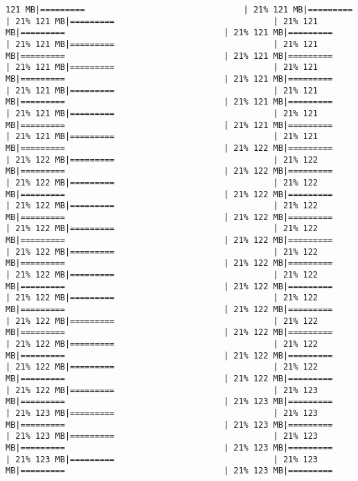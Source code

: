 \documentclass[
]{article}
\begin{document}
\begin{verbatim}
121 MB|=========                                | 21% 121 MB|=========                                | 21% 121 MB|=========                                | 21% 121 MB|=========                                | 21% 121 MB|=========                                | 21% 121 MB|=========                                | 21% 121 MB|=========                                | 21% 121 MB|=========                                | 21% 121 MB|=========                                | 21% 121 MB|=========                                | 21% 121 MB|=========                                | 21% 121 MB|=========                                | 21% 121 MB|=========                                | 21% 121 MB|=========                                | 21% 121 MB|=========                                | 21% 121 MB|=========                                | 21% 121 MB|=========                                | 21% 121 MB|=========                                | 21% 121 MB|=========                                | 21% 122 MB|=========                                | 21% 122 MB|=========                                | 21% 122 MB|=========                                | 21% 122 MB|=========                                | 21% 122 MB|=========                                | 21% 122 MB|=========                                | 21% 122 MB|=========                                | 21% 122 MB|=========                                | 21% 122 MB|=========                                | 21% 122 MB|=========                                | 21% 122 MB|=========                                | 21% 122 MB|=========                                | 21% 122 MB|=========                                | 21% 122 MB|=========                                | 21% 122 MB|=========                                | 21% 122 MB|=========                                | 21% 122 MB|=========                                | 21% 122 MB|=========                                | 21% 122 MB|=========                                | 21% 122 MB|=========                                | 21% 122 MB|=========                                | 21% 122 MB|=========                                | 21% 122 MB|=========                                | 21% 122 MB|=========                                | 21% 122 MB|=========                                | 21% 122 MB|=========                                | 21% 122 MB|=========                                | 21% 122 MB|=========                                | 21% 122 MB|=========                                | 21% 122 MB|=========                                | 21% 122 MB|=========                                | 21% 122 MB|=========                                | 21% 123 MB|=========                                | 21% 123 MB|=========                                | 21% 123 MB|=========                                | 21% 123 MB|=========                                | 21% 123 MB|=========                                | 21% 123 MB|=========                                | 21% 123 MB|=========                                | 21% 123 MB|=========                                | 21% 123 MB|=========                                | 21% 123 MB|=========                                | 21% 123 MB|=========         
\end{verbatim}
\end{document}

